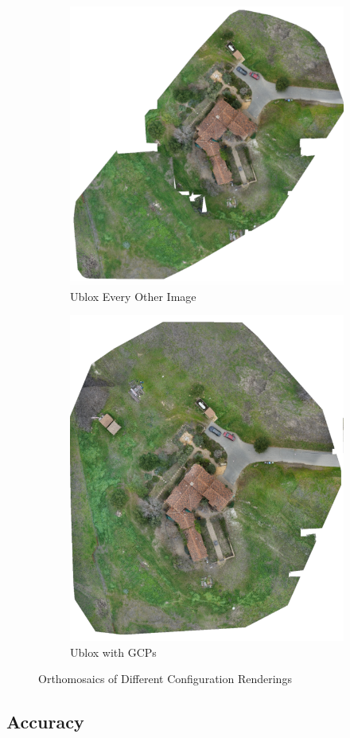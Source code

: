 \documentclass{article}
\begin{document}
\begin{figure}
\begin{subfigure}{.33\textwidth}
  \includegraphics[width=.72\linewidth]{images/orthomosaics/ublox_every_other_image.png}
  \caption{Ublox Every Other Image}
  \label{fig:sub1}
\end{subfigure}%
\begin{subfigure}{.33\textwidth}
  \centering
  \includegraphics[width=.72\linewidth]{images/orthomosaics/ublox_gcp.png}
  \caption{Ublox with GCPs}
  \label{fig:sub1}
\end{subfigure}%
\caption{Orthomosaics of Different Configuration Renderings}
\label{ortho}
\end{figure}

\subsection{Accuracy}
\end{document}
